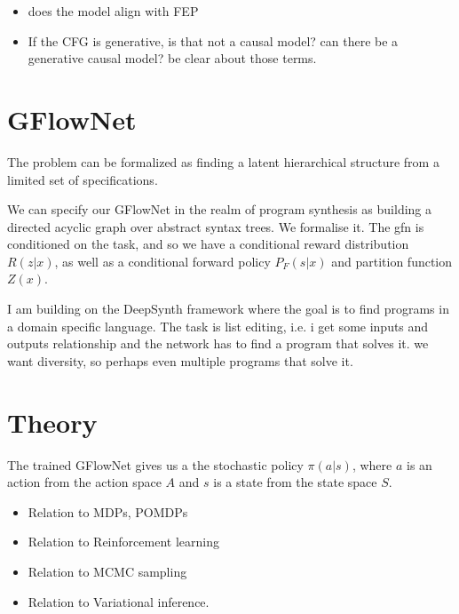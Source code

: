 \begin{itemize}
    \item does the model align with FEP
    \item If the CFG is generative, is that not a causal model? can there be a generative causal model? be clear about those terms. 
\end{itemize}


\section{GFlowNet}
The problem can be formalized as finding a latent hierarchical structure from a limited set of specifications.

We can specify our GFlowNet in the realm of program synthesis as building a directed acyclic graph over abstract syntax trees.
We formalise it. 
The gfn is conditioned on the task, and so we have a conditional reward distribution $R(z|x)$, as well as a conditional forward policy $P_F(s|x)$ and partition function $Z(x)$.

I am building on the DeepSynth framework where the goal is to find programs in a domain specific language. 
The task is list editing, i.e. i get some inputs and outputs relationship and the network has to find a program that solves it. 
we want diversity, so perhaps even multiple programs that solve it.

\section{Theory}

The trained GFlowNet gives us a the stochastic policy $\pi(a|s)$, where $a$ is an action from the action space $A$ and $s$ is a state from the state space $S$.

\begin{itemize}
    \item Relation to MDPs, POMDPs
    \item Relation to Reinforcement learning
    \item Relation to MCMC sampling
    \item Relation to Variational inference. 
\end{itemize}

